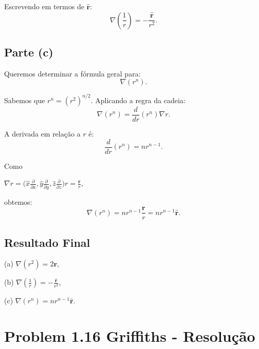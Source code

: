 \documentclass[a4paper,12pt]{article}
\begin{document}
Escrevendo em termos de \(\hat{\mathbf{r}}\):
\begin{equation}
\nabla \left(\frac{1}{r}\right) = -\frac{\hat{\mathbf{r}}}{r^2}.
\end{equation}

\subsection*{Parte (c)}

Queremos determinar a fórmula geral para:
\begin{equation}
\nabla (r^n).
\end{equation}

Sabemos que \(r^n = (r^2)^{n/2}\). Aplicando a regra da cadeia:
\begin{equation}
\nabla (r^n) = \frac{d}{dr}(r^n) \nabla r.
\end{equation}

A derivada em relação a \(r\) é:
\begin{equation}
\frac{d}{dr}(r^n) = n r^{n-1}.
\end{equation}

Como 

\(\nabla r = \Big(\hat{x}\frac{\partial}{\partial x}, \hat{y}\frac{\partial}{\partial y}, \hat{z}\frac{\partial }{\partial z} \Big) r  = \frac{\mathbf{r}}{r}\), 


obtemos:
\begin{equation}
\nabla (r^n) = n r^{n-1} \frac{\mathbf{r}}{r} = n r^{n-1} \hat{\mathbf{r}}.
\end{equation}

\subsection*{Resultado Final}

(a) \(\nabla (r^2) = 2\mathbf{r}\),

(b) \(\nabla \left(\frac{1}{r}\right) = -\frac{\hat{\mathbf{r}}}{r^2}\),

(c) \(\nabla (r^n) = n r^{n-1} \hat{\mathbf{r}}\).


\section*{Problem 1.16 Griffiths - Resolu\c{c}\~ao}
\end{document}
